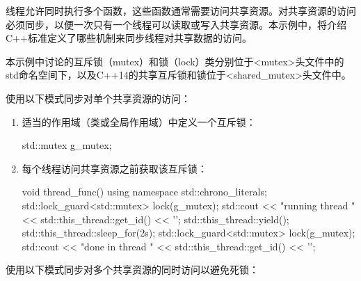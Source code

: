 
线程允许同时执行多个函数，这些函数通常需要访问共享资源。对共享资源的访问必须同步，以便一次只有一个线程可以读取或写入共享资源。本示例中，将介绍C++标准定义了哪些机制来同步线程对共享数据的访问。


本示例中讨论的互斥锁（mutex）和锁（lock）类分别位于<mutex>头文件中的std命名空间下，以及C++14的共享互斥锁和锁位于<shared\_mutex>头文件中。


使用以下模式同步对单个共享资源的访问：

\begin{enumerate}
\item
适当的作用域（类或全局作用域）中定义一个互斥锁：

\begin{cpp}
std::mutex g_mutex;
\end{cpp}

\item
每个线程访问共享资源之前获取该互斥锁：

\begin{cpp}
void thread_func()
{
    using namespace std::chrono_literals;
    {
        std::lock_guard<std::mutex> lock(g_mutex);
        std::cout << "running thread "
                  << std::this_thread::get_id() << '\n';
    }
    std::this_thread::yield();
    std::this_thread::sleep_for(2s);
    {
        std::lock_guard<std::mutex> lock(g_mutex);
        std::cout << "done in thread "
                  << std::this_thread::get_id() << '\n';
    }
}
\end{cpp}
\end{enumerate}

使用以下模式同步对多个共享资源的同时访问以避免死锁：

